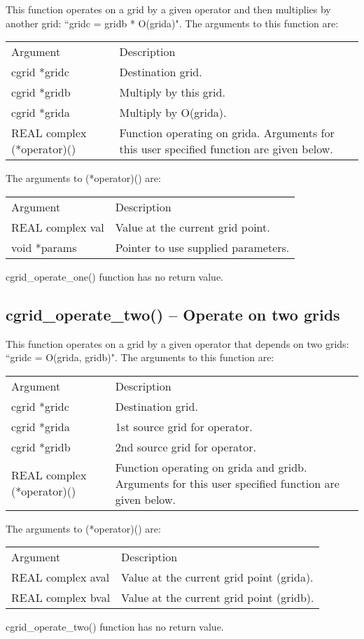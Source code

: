 \documentclass[12pt,letterpaper]{report}
\begin{document}
This function  operates on a grid by a given operator and then multiplies by another grid: ``gridc = gridb * O(grida)". The arguments to this function are:
\begin{longtable}{p{} p{}}
Argument & Description\\
\cline{1-2}
cgrid *gridc & Destination grid.\\
cgrid *gridb & Multiply by this grid.\\
cgrid *grida & Multiply by O(grida).\\
REAL complex (*operator)() & Function operating on grida. Arguments for this user specified function are given below.\\
\end{longtable}
The arguments to (*operator)() are:
\begin{longtable}{p{} p{}}
Argument & Description\\
\cline{1-2}
REAL complex val & Value at the current grid point.\\
void *params & Pointer to use supplied parameters.\\
\end{longtable}
\noindent
cgrid\_operate\_one() function has no return value.

\subsection{cgrid\_operate\_two() -- Operate on two grids}

This function  operates on a grid by a given operator that depends on two grids: ``gridc = O(grida, gridb)". The arguments to this function are:
\begin{longtable}{p{} p{}}
Argument & Description\\
\cline{1-2}
cgrid *gridc & Destination grid.\\
cgrid *grida & 1st source grid for operator.\\
cgrid *gridb & 2nd source grid for operator.\\
REAL complex (*operator)() & Function operating on grida and gridb. Arguments for this user specified function are given below.\\
\end{longtable}
The arguments to (*operator)() are:
\begin{longtable}{p{} p{}}
Argument & Description\\
\cline{1-2}
REAL complex aval & Value at the current grid point (grida).\\
REAL complex bval & Value at the current grid point (gridb).\\
\end{longtable}
\noindent
cgrid\_operate\_two() function has no return value.
\end{document}
